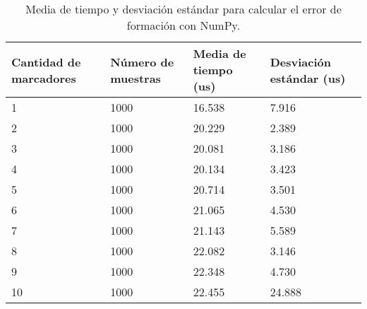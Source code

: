 \begin{table}[H]
	\centering
	\resizebox{\textwidth}{!} {
	\begin{tabular}{|l|l|l|l|}
		\hline
		\textbf{Cantidad de marcadores} & \textbf{Número de muestras} & \textbf{Media de tiempo (us)} & \textbf{Desviación estándar (us)} \\ \hline
		1                               & 1000                        & 16.538                        & 7.916                             \\ \hline
		2                               & 1000                        & 20.229                        & 2.389                             \\ \hline
		3                               & 1000                        & 20.081                        & 3.186                             \\ \hline
		4                               & 1000                        & 20.134                        & 3.423                             \\ \hline
		5                               & 1000                        & 20.714                        & 3.501                             \\ \hline
		6                               & 1000                        & 21.065                        & 4.530                             \\ \hline
		7                               & 1000                        & 21.143                        & 5.589                             \\ \hline
		8                               & 1000                        & 22.082                        & 3.146                             \\ \hline
		9                               & 1000                        & 22.348                        & 4.730                             \\ \hline
		10                              & 1000                        & 22.455                        & 24.888                            \\ \hline
	\end{tabular}}
	\caption{Media de tiempo y desviación estándar para calcular el error de formación con NumPy.}
	\label{cuadro:tiempos_error_numpy}
\end{table}

